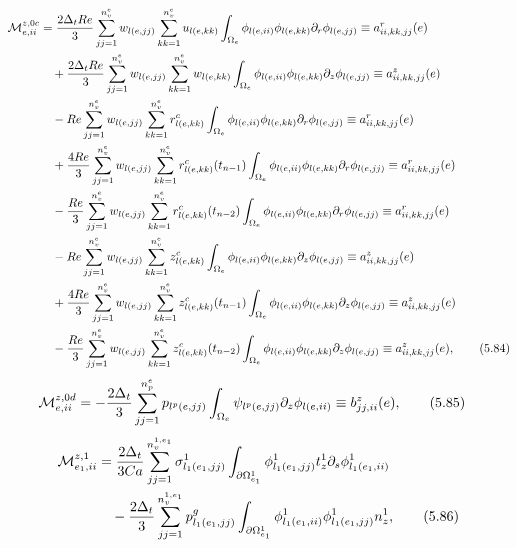 \documentclass{article}
\begin{document}
\begin{align}
\mathcal{M}_{e,ii}^{z,0c} &= \frac{2\Delta_t Re}{3} \sum_{jj=1}^{n_v^e} w_{l(e,jj)} \sum_{kk=1}^{n_v^e} u_{l(e,kk)} \int_{\Omega_e} \phi_{l(e,ii)} \phi_{l(e,kk)} \partial_r \phi_{l(e,jj)} \equiv a_{ii,kk,jj}^r(e) \nonumber\\
&\quad + \frac{2\Delta_t Re}{3} \sum_{jj=1}^{n_v^e} w_{l(e,jj)} \sum_{kk=1}^{n_v^e} w_{l(e,kk)} \int_{\Omega_e} \phi_{l(e,ii)} \phi_{l(e,kk)} \partial_z \phi_{l(e,jj)} \equiv a_{ii,kk,jj}^z(e) \nonumber\\
&\quad - Re \sum_{jj=1}^{n_v^e} w_{l(e,jj)} \sum_{kk=1}^{n_v^e} r_{l(e,kk)}^c \int_{\Omega_e} \phi_{l(e,ii)} \phi_{l(e,kk)} \partial_r \phi_{l(e,jj)} \equiv a_{ii,kk,jj}^r(e) \nonumber\\
&\quad + \frac{4Re}{3} \sum_{jj=1}^{n_v^e} w_{l(e,jj)} \sum_{kk=1}^{n_v^e} r_{l(e,kk)}^c(t_{n-1}) \int_{\Omega_e} \phi_{l(e,ii)} \phi_{l(e,kk)} \partial_r \phi_{l(e,jj)} \equiv a_{ii,kk,jj}^r(e) \nonumber\\
&\quad - \frac{Re}{3} \sum_{jj=1}^{n_v^e} w_{l(e,jj)} \sum_{kk=1}^{n_v^e} r_{l(e,kk)}^c(t_{n-2}) \int_{\Omega_e} \phi_{l(e,ii)} \phi_{l(e,kk)} \partial_r \phi_{l(e,jj)} \equiv a_{ii,kk,jj}^r(e) \nonumber\\
&\quad - Re \sum_{jj=1}^{n_v^e} w_{l(e,jj)} \sum_{kk=1}^{n_v^e} z_{l(e,kk)}^c \int_{\Omega_e} \phi_{l(e,ii)} \phi_{l(e,kk)} \partial_z \phi_{l(e,jj)} \equiv a_{ii,kk,jj}^z(e) \nonumber\\
&\quad + \frac{4Re}{3} \sum_{jj=1}^{n_v^e} w_{l(e,jj)} \sum_{kk=1}^{n_v^e} z_{l(e,kk)}^c(t_{n-1}) \int_{\Omega_e} \phi_{l(e,ii)} \phi_{l(e,kk)} \partial_z \phi_{l(e,jj)} \equiv a_{ii,kk,jj}^z(e) \nonumber\\
&\quad - \frac{Re}{3} \sum_{jj=1}^{n_v^e} w_{l(e,jj)} \sum_{kk=1}^{n_v^e} z_{l(e,kk)}^c(t_{n-2}) \int_{\Omega_e} \phi_{l(e,ii)} \phi_{l(e,kk)} \partial_z \phi_{l(e,jj)} \equiv a_{ii,kk,jj}^z(e), \tag{5.84}
\end{align}
\begin{align}
\mathcal{M}_{e,ii}^{z,0d} &= -\frac{2\Delta_t}{3} \sum_{jj=1}^{n_p^e} p_{l^p(e,jj)} \int_{\Omega_e} \psi_{l^p(e,jj)} \partial_z \phi_{l(e,ii)} \equiv b_{jj,ii}^z(e), \tag{5.85}
\end{align}
\begin{align}
\mathcal{M}_{e_1,ii}^{z,1} &= \frac{2\Delta_t}{3Ca} \sum_{jj=1}^{n_v^{1,e_1}} \sigma_{l_1(e_1,jj)}^1 \int_{\partial \Omega_{e_1}^1} \phi_{l_1(e_1,jj)}^1 t_z^1 \partial_s \phi_{l_1(e_1,ii)}^1 \nonumber\\
&\quad - \frac{2\Delta_t}{3} \sum_{jj=1}^{n_v^{1,e_1}} p_{l_1(e_1,jj)}^g \int_{\partial \Omega_{e_1}^1} \phi_{l_1(e_1,ii)}^1 \phi_{l_1(e_1,jj)}^1 n_z^1, \tag{5.86}
\end{align}
\end{document}
